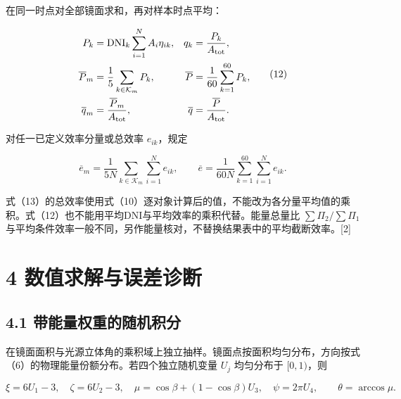 \documentclass[UTF8,fontset=windows,zihao=-4]{ctexart}
\begin{document}
\par\noindent\begin{minipage}{\linewidth}
在同一时点对全部镜面求和，再对样本时点平均：

\[
\begin{aligned}
P_k&=\mathrm{DNI}_k\sum_{i=1}^N A_i\eta_{ik},
& q_k&=\frac{P_k}{A_{\rm tot}},\\
\overline P_m&=\frac15\sum_{k\in\mathcal K_m}P_k,
&\overline P&=\frac1{60}\sum_{k=1}^{60}P_k,\\
\overline q_m&=\frac{\overline P_m}{A_{\rm tot}},
&\overline q&=\frac{\overline P}{A_{\rm tot}}.
\end{aligned}\tag{12}
\]
\end{minipage}\par

\par\noindent\begin{minipage}{\linewidth}
对任一已定义效率分量或总效率 \(e_{ik}\)，规定

\[
\overline e_m=\frac1{5N}\sum_{k\in\mathcal K_m}\sum_{i=1}^N e_{ik},
\qquad
\overline e=\frac1{60N}\sum_{k=1}^{60}\sum_{i=1}^N e_{ik}.
\tag{13}
\]
\end{minipage}\par

式（13）的总效率使用式（10）逐对象计算后的值，不能改为各分量平均值的乘积。式（12）也不能用平均DNI与平均效率的乘积代替。能量总量比 \(\sum\Pi_2/\sum\Pi_1\) 与平均条件效率一般不同，另作能量核对，不替换结果表中的平均截断效率。[2]
\section*{4 数值求解与误差诊断}

\subsection*{4.1 带能量权重的随机积分}

\par\noindent\begin{minipage}{\linewidth}
在镜面面积与光源立体角的乘积域上独立抽样。镜面点按面积均匀分布，方向按式（6）的物理能量份额分布。若四个独立随机变量 \(U_j\) 均匀分布于 \([0,1)\)，则

\[
\xi=6U_1-3,\quad \zeta=6U_2-3,\quad
\mu=\cos\beta+(1-\cos\beta)U_3,\quad \psi=2\pi U_4,
\qquad\theta=\arccos\mu.
\tag{14}
\]
\end{minipage}\par
\end{document}
